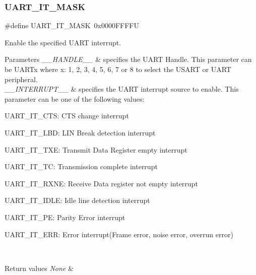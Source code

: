 \subsubsection{\texorpdfstring{U\+A\+R\+T\+\_\+\+I\+T\+\_\+\+M\+A\+SK}{UART\_IT\_MASK}}
{\footnotesize\ttfamily \#define U\+A\+R\+T\+\_\+\+I\+T\+\_\+\+M\+A\+SK~0x0000\+F\+F\+F\+FU}



Enable the specified U\+A\+RT interrupt. 


\begin{DoxyParams}{Parameters}
{\em \+\_\+\+\_\+\+H\+A\+N\+D\+L\+E\+\_\+\+\_\+} & specifies the U\+A\+RT Handle. This parameter can be U\+A\+R\+Tx where x\+: 1, 2, 3, 4, 5, 6, 7 or 8 to select the U\+S\+A\+RT or U\+A\+RT peripheral. \\
\hline
{\em \+\_\+\+\_\+\+I\+N\+T\+E\+R\+R\+U\+P\+T\+\_\+\+\_\+} & specifies the U\+A\+RT interrupt source to enable. This parameter can be one of the following values\+: \begin{DoxyItemize}
\item U\+A\+R\+T\+\_\+\+I\+T\+\_\+\+C\+TS\+: C\+TS change interrupt \item U\+A\+R\+T\+\_\+\+I\+T\+\_\+\+L\+BD\+: L\+IN Break detection interrupt \item U\+A\+R\+T\+\_\+\+I\+T\+\_\+\+T\+XE\+: Transmit Data Register empty interrupt \item U\+A\+R\+T\+\_\+\+I\+T\+\_\+\+TC\+: Transmission complete interrupt \item U\+A\+R\+T\+\_\+\+I\+T\+\_\+\+R\+X\+NE\+: Receive Data register not empty interrupt \item U\+A\+R\+T\+\_\+\+I\+T\+\_\+\+I\+D\+LE\+: Idle line detection interrupt \item U\+A\+R\+T\+\_\+\+I\+T\+\_\+\+PE\+: Parity Error interrupt \item U\+A\+R\+T\+\_\+\+I\+T\+\_\+\+E\+RR\+: Error interrupt(\+Frame error, noise error, overrun error) \end{DoxyItemize}
\\
\hline
\end{DoxyParams}

\begin{DoxyRetVals}{Return values}
{\em None} & \\
\hline
\end{DoxyRetVals}
